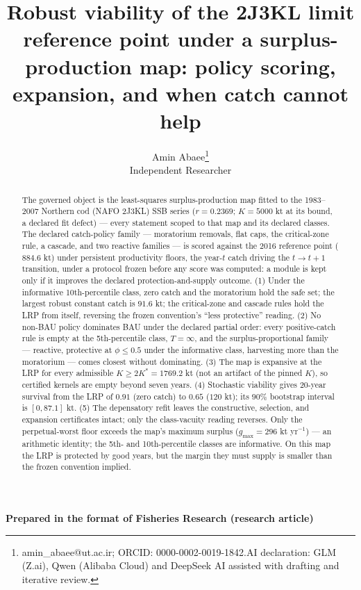 \documentclass[11pt]{article}
\begin{document}
\title{Robust viability of the 2J3KL limit reference point under a surplus-production map: policy scoring, expansion, and when catch cannot help}
\author{Amin Abaee\thanks{amin\_abaee@ut.ac.ir; ORCID: 0000-0002-0019-1842.\newline AI declaration: GLM (Z.ai), Qwen (Alibaba Cloud) and DeepSeek AI assisted with drafting and iterative review.} \\ Independent Researcher}
\date{}
\maketitle

{\centering\small \textbf{Prepared in the format of Fisheries Research (research article)}\par}

\begin{abstract}


The governed object is the least-squares surplus-production map fitted
to the 1983--2007 Northern cod (NAFO 2J3KL) SSB series (\(r = 0.2369\);
\(K = 5000\) kt at its bound, a declared fit defect) --- every statement
scoped to that map and its declared classes. The declared catch-policy
family --- moratorium removals, flat caps, the critical-zone rule, a
cascade, and two reactive families --- is scored against the 2016
reference point (\(884.6\) kt) under persistent productivity floors, the
year-\(t\) catch driving the \(t \to t+1\) transition, under a protocol
frozen before any score was computed: a module is kept only if it
improves the declared protection-and-supply outcome. (1) Under the
informative 10th-percentile class, zero catch and the moratorium hold
the safe set; the largest robust constant catch is \(91.6\) kt; the
critical-zone and cascade rules hold the LRP from itself, reversing the
frozen convention's ``less protective'' reading. (2) No non-BAU policy
dominates BAU under the declared partial order: every positive-catch
rule is empty at the 5th-percentile class, \(T=\infty\), and the
surplus-proportional family --- reactive, protective at \(\phi \le 0.5\)
under the informative class, harvesting more than the moratorium ---
comes closest without dominating. (3) The map is expansive at the LRP
for every admissible \(K \ge 2K^* = 1769.2\) kt (not an artifact of the
pinned \(K\)), so certified kernels are empty beyond seven years. (4)
Stochastic viability gives 20-year survival from the LRP of \(0.91\)
(zero catch) to \(0.65\) (\(120\) kt); its \(90\%\) bootstrap interval
is \([0, 87.1]\) kt. (5) The depensatory refit leaves the constructive,
selection, and expansion certificates intact; only the class-vacuity
reading reverses. Only the perpetual-worst floor exceeds the map's
maximum surplus (\(g_{\max} = 296\) kt yr\(^{-1}\)) --- an arithmetic
identity; the 5th- and 10th-percentile classes are informative. On this
map the LRP is protected by good years, but the margin they must supply
is smaller than the frozen convention implied.

\end{abstract}
\end{document}
